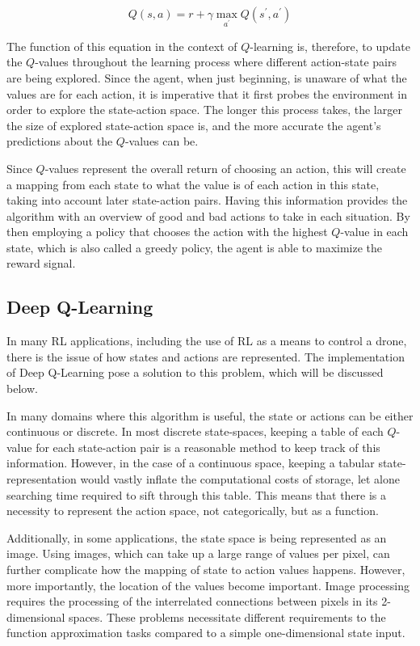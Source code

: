 \begin{equation}
    Q(s, a)=r+\gamma \max_{a^{\prime}} Q\left(s^{\prime}, a^{\prime}\right)
\end{equation}

The function of this equation in the context of $Q$-learning is, therefore, to update the 
$Q$-values throughout
the learning process where different action-state pairs are being explored. Since the agent, 
when just beginning, is unaware of what the values are for each action, it is imperative 
that it first probes the environment in order to explore the state-action space. The longer 
this process takes, the larger the size of explored state-action space is, and the more accurate 
the agent's predictions about the $Q$-values can be. 

Since $Q$-values represent the overall return of choosing
an action, this will create a mapping from each state to what the value is of each action in 
this state,
taking into account later state-action pairs. Having this information provides the algorithm 
with an overview of good and bad actions to take in each situation. By then employing a policy 
that 
chooses the action with the highest $Q$-value in each state, which is also called a greedy 
policy, 
the agent is able to maximize the reward signal.

\subsection{Deep Q-Learning}
In many RL applications, including the use of RL as a means to control a drone, there is the  
issue of how states and actions are represented. The implementation of Deep Q-Learning \cite{DQNDeepmind}
pose a solution to this problem, which will be discussed below.

In many domains where this algorithm 
is useful, the state or actions can be either continuous or discrete. In most discrete 
state-spaces, keeping a table of each $Q$-value for each state-action pair is a reasonable 
method to keep track of this information. However, in the case of 
a continuous space, keeping a tabular state-representation would vastly inflate the 
computational costs of 
storage, let alone searching time required to sift through this table. This means that 
there is a necessity 
to represent the action space, not categorically, but as a function. 

Additionally, in some applications, the state space is being represented as an image. Using 
images, which can take up a large range of values per pixel, can further complicate how the 
mapping of state to action values happens. However, more importantly, the location of 
the values become important. Image processing requires the processing of the interrelated 
connections between pixels in its 2-dimensional spaces. These problems necessitate 
different requirements to the function approximation tasks compared to a simple one-dimensional 
state input. \newline

